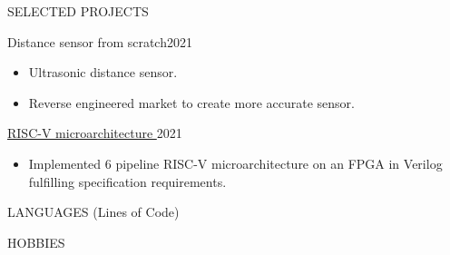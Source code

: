 \documentclass{resume}
\begin{document}
\begin{minipage}[t]{0.54\textwidth}
\begin{rsection}{\MakeUppercase{selected projects}}
\begin{rcontent}{Distance sensor from scratch}{2021}{}
\begin{techtag}
			\item {}
		\end{techtag}
			\begin{itemize}
				\item Ultrasonic distance sensor.
				\item Reverse engineered market to create more accurate sensor.
			\end{itemize}
		\end{rcontent}
		\divider
		\begin{rcontent}{\href{https://github.com/solomspd/RISC-V-CPU}{RISC-V microarchitecture \hspace{0.25em} \iconin{\faGithub}}}{2021}{}
		\begin{techtag}
			\item {}
			\item {}
			\item {}
		\end{techtag}
			\begin{itemize}
				\item Implemented 6 pipeline RISC-V microarchitecture on an FPGA in Verilog fulfilling specification requirements.
			\end{itemize}
		\end{rcontent}

	\end{rsection}

	\begin{rfloat}{\MakeUppercase{languages} (Lines of Code)}
		\begin{techlist}
			\item {}
			\item {}
			\item {}
			\item {}
			\item {}
			\item {}
			\item {}
			\item {}
			\item {}
			\item {}
			\item {}
		\end{techlist}
	\end{rfloat}

	\begin{rsection}{\MakeUppercase{hobbies}}


\end{rsection}
\end{minipage}
\end{document}
